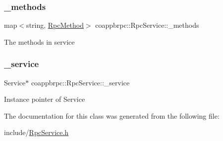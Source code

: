 \subsubsection{\texorpdfstring{\+\_\+methods}{\_methods}}
{\footnotesize\ttfamily map$<$string, \hyperlink{classcoappbrpc_1_1RpcMethod}{Rpc\+Method}$>$ coappbrpc\+::\+Rpc\+Service\+::\+\_\+methods}

The methods in service \mbox{\label{classcoappbrpc_1_1RpcService_ab79621dd2a66b154352101e64f2dfefa}} 
\subsubsection{\texorpdfstring{\+\_\+service}{\_service}}
{\footnotesize\ttfamily Service$\ast$ coappbrpc\+::\+Rpc\+Service\+::\+\_\+service}

Instance pointer of Service 

The documentation for this class was generated from the following file\+:\begin{DoxyCompactItemize}
\item 
include/\hyperlink{RpcService_8h}{Rpc\+Service.\+h}\end{DoxyCompactItemize}
